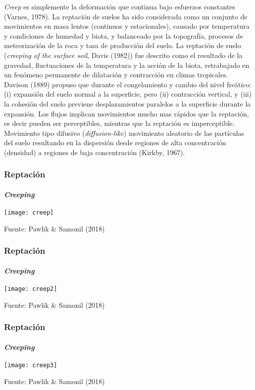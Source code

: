 \documentclass{beamer}
\begin{document}
\begin{frame}
\normalem
\justifying
\small{
\emph{Creep} es simplemente la deformación que continua bajo esfuerzos constantes (Varnes, 1978).\vfill
La reptación de suelos ha sido considerada como un conjunto de movimientos en masa lentos (continuos y estacionales), causado por temperatura y condiciones de humedad y biota, y balanceado por la topografía, procesos de meteorización de la roca y tasa de producción del suelo.\vfill
La reptación de suelo (\emph{creeping of the surface soil}, Davis (1982)) fue descrito como el resultado de la gravedad, fluctuaciones de la temperatura y la acción de la biota, retrabajado en un fenómeno permanente de dilatación y contracción en climas tropicales.\vfill
Davison (1889) propuso que durante el congelamiento y cambio del nivel freático: (i) expansión del suelo normal a la superficie, pero (ii) contracción vertical, y (iii) la cohesión del suelo previene desplazamientos paralelos a la superficie durante la expansión.\vfill
Los flujos implican movimientos mucho mas rápidos que la reptación, es decir pueden ser perceptibles, mientras que la reptación es imperceptible.\vfill
Movimiento tipo difusivo (\emph{diffusion-like}) movimiento aleatorio de las partículas del suelo resultando en la dispersión desde regiones de alta concentración (densidad) a regiones de baja concentración (Kirkby, 1967).}
\end{frame}
\begin{frame}
\frametitle{Reptación}
\framesubtitle{\it{Creeping}}
\begin{center}
   	\texttt{[image: creep]}
\end{center}
\tiny{Fuente: Pawlik \& Samonil (2018)}
\end{frame}
\begin{frame}
\frametitle{Reptación}
\framesubtitle{\it{Creeping}}
\begin{center}
   	\texttt{[image: creep2]}
\end{center}
\tiny{Fuente: Pawlik \& Samonil (2018)}
\end{frame}
\begin{frame}
\frametitle{Reptación}
\framesubtitle{\it{Creeping}}
\begin{center}
   	\texttt{[image: creep3]}
\end{center}
\tiny{Fuente: Pawlik \& Samonil (2018)}
\end{frame}
\end{document}
